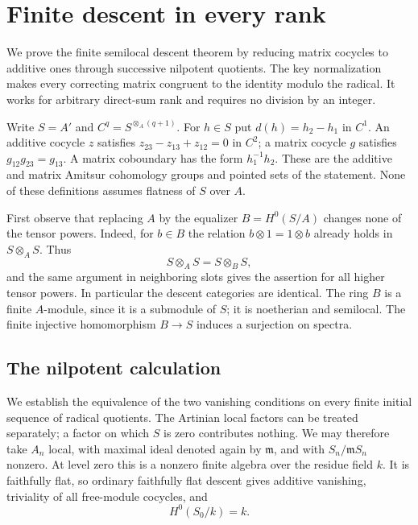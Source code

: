 \section{Finite descent in every rank}\label{sec:finite-descent}

We prove the finite semilocal descent theorem by reducing matrix cocycles to additive ones through successive nilpotent quotients. The key normalization makes every correcting matrix congruent to the identity modulo the radical. It works for arbitrary direct-sum rank and requires no division by an integer.

Write $S=A'$ and $C^q=S^{\otimes_A(q+1)}$. For $h\in S$ put $d(h)=h_2-h_1$ in $C^1$. An additive cocycle $z$ satisfies $z_{23}-z_{13}+z_{12}=0$ in $C^2$; a matrix cocycle $g$ satisfies $g_{12}g_{23}=g_{13}$. A matrix coboundary has the form $h_1^{-1}h_2$. These are the additive and matrix Amitsur cohomology groups and pointed sets of the statement. None of these definitions assumes flatness of $S$ over $A$.

First observe that replacing $A$ by the equalizer $B=H^0(S/A)$ changes none of the tensor powers. Indeed, for $b\in B$ the relation $b\otimes1=1\otimes b$ already holds in $S\otimes_AS$. Thus
\begin{equation}\label{eq:equalizer-tensor}
 S\otimes_AS=S\otimes_BS,
\end{equation}
and the same argument in neighboring slots gives the assertion for all higher tensor powers. In particular the descent categories are identical. The ring $B$ is a finite $A$-module, since it is a submodule of $S$; it is noetherian and semilocal. The finite injective homomorphism $B\to S$ induces a surjection on spectra.

\subsection{The nilpotent calculation}

We establish the equivalence of the two vanishing conditions on every finite initial sequence of radical quotients. The Artinian local factors can be treated separately; a factor on which $S$ is zero contributes nothing. We may therefore take $A_n$ local, with maximal ideal denoted again by $\mathfrak m$, and with $S_n/\mathfrak mS_n$ nonzero. At level zero this is a nonzero finite algebra over the residue field $k$. It is faithfully flat, so ordinary faithfully flat descent gives additive vanishing, triviality of all free-module cocycles, and
\begin{equation}\label{eq:field-equalizer}
 H^0(S_0/k)=k.
\end{equation}

